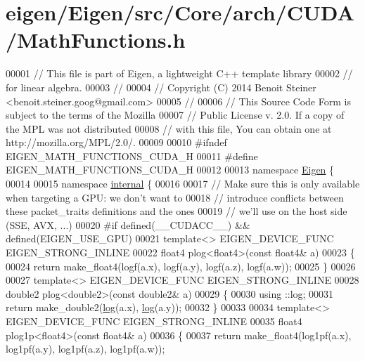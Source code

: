 \hypertarget{eigen_2_eigen_2src_2_core_2arch_2_c_u_d_a_2_math_functions_8h_source}{}\section{eigen/\+Eigen/src/\+Core/arch/\+C\+U\+D\+A/\+Math\+Functions.h}
\label{eigen_2_eigen_2src_2_core_2arch_2_c_u_d_a_2_math_functions_8h_source}

\begin{DoxyCode}
00001 \textcolor{comment}{// This file is part of Eigen, a lightweight C++ template library}
00002 \textcolor{comment}{// for linear algebra.}
00003 \textcolor{comment}{//}
00004 \textcolor{comment}{// Copyright (C) 2014 Benoit Steiner <benoit.steiner.goog@gmail.com>}
00005 \textcolor{comment}{//}
00006 \textcolor{comment}{// This Source Code Form is subject to the terms of the Mozilla}
00007 \textcolor{comment}{// Public License v. 2.0. If a copy of the MPL was not distributed}
00008 \textcolor{comment}{// with this file, You can obtain one at http://mozilla.org/MPL/2.0/.}
00009 
00010 \textcolor{preprocessor}{#ifndef EIGEN\_MATH\_FUNCTIONS\_CUDA\_H}
00011 \textcolor{preprocessor}{#define EIGEN\_MATH\_FUNCTIONS\_CUDA\_H}
00012 
00013 \textcolor{keyword}{namespace }\hyperlink{namespace_eigen}{Eigen} \{
00014 
00015 \textcolor{keyword}{namespace }\hyperlink{namespaceinternal}{internal} \{
00016 
00017 \textcolor{comment}{// Make sure this is only available when targeting a GPU: we don't want to}
00018 \textcolor{comment}{// introduce conflicts between these packet\_traits definitions and the ones}
00019 \textcolor{comment}{// we'll use on the host side (SSE, AVX, ...)}
00020 \textcolor{preprocessor}{#if defined(\_\_CUDACC\_\_) && defined(EIGEN\_USE\_GPU)}
00021 \textcolor{keyword}{template}<> EIGEN\_DEVICE\_FUNC EIGEN\_STRONG\_INLINE
00022 float4 plog<float4>(\textcolor{keyword}{const} float4& a)
00023 \{
00024   \textcolor{keywordflow}{return} make\_float4(logf(a.x), logf(a.y), logf(a.z), logf(a.w));
00025 \}
00026 
00027 \textcolor{keyword}{template}<>  EIGEN\_DEVICE\_FUNC EIGEN\_STRONG\_INLINE
00028 double2 plog<double2>(\textcolor{keyword}{const} double2& a)
00029 \{
00030   using ::log;
00031   \textcolor{keywordflow}{return} make\_double2(\hyperlink{structlog}{log}(a.x), \hyperlink{structlog}{log}(a.y));
00032 \}
00033 
00034 \textcolor{keyword}{template}<> EIGEN\_DEVICE\_FUNC EIGEN\_STRONG\_INLINE
00035 float4 plog1p<float4>(\textcolor{keyword}{const} float4& a)
00036 \{
00037   \textcolor{keywordflow}{return} make\_float4(log1pf(a.x), log1pf(a.y), log1pf(a.z), log1pf(a.w));

\end{DoxyCode}
